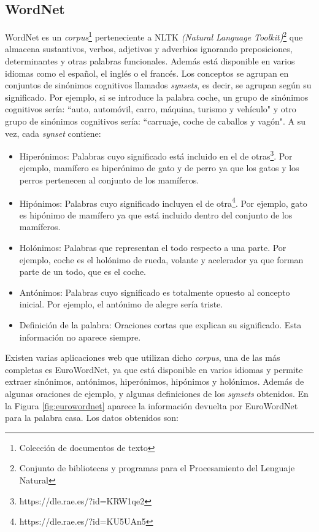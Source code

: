 \subsection{WordNet}
\label{cap:subsec:wordnet}
WordNet es un \textit{corpus}\footnote{Colección de documentos de texto} perteneciente a NLTK \textit{(Natural Language Toolkit)}\footnote{Conjunto de bibliotecas y programas para el Procesamiento del Lenguaje Natural} que almacena sustantivos, verbos, adjetivos y adverbios ignorando preposiciones, determinantes y otras palabras funcionales. Además está disponible en varios idiomas como el español, el inglés o el francés. Los conceptos se agrupan en conjuntos de sinónimos cognitivos llamados \textit{synsets}, es decir, se agrupan según su significado. Por ejemplo, si se introduce la palabra coche, un grupo de sinónimos cognitivos sería: ``auto, automóvil, carro, máquina, turismo y vehículo" y otro grupo de sinónimos cognitivos sería: ``carruaje, coche de caballos y vagón". A su vez, cada \textit{synset} contiene:
\begin{itemize}
	
	\item Hiperónimos: Palabras cuyo significado está incluido en el de otras\footnote{https://dle.rae.es/?id=KRW1qe2}. Por ejemplo, mamífero es hiperónimo de gato y de perro ya que los gatos y los perros pertenecen al conjunto de los mamíferos.
	\item Hipónimos: Palabras cuyo significado incluyen el de otra\footnote{https://dle.rae.es/?id=KU5UAn5}. Por ejemplo, gato es hipónimo de mamífero ya que está incluido dentro del conjunto de los mamíferos.
	\item Holónimos: Palabras que representan el todo respecto a una parte. Por ejemplo, coche es el holónimo de rueda, volante y acelerador ya que forman parte de un todo, que es el coche.
	\item Antónimos: Palabras cuyo significado es totalmente opuesto al concepto inicial. Por ejemplo, el antónimo de alegre sería triste.
	\item Definición de la palabra: Oraciones cortas que explican su significado. Esta información no aparece siempre.
\end{itemize} 

Existen varias aplicaciones web que utilizan dicho \textit{corpus}, una de las más completas es EuroWordNet, ya que está disponible en varios idiomas y permite extraer sinónimos, antónimos, hiperónimos, hipónimos y holónimos. Además de algunas oraciones de ejemplo, y algunas definiciones de los \textit{synsets} obtenidos. En la Figura \ref{fig:eurowordnet} aparece la información devuelta por EuroWordNet para la palabra casa. Los datos obtenidos son:


